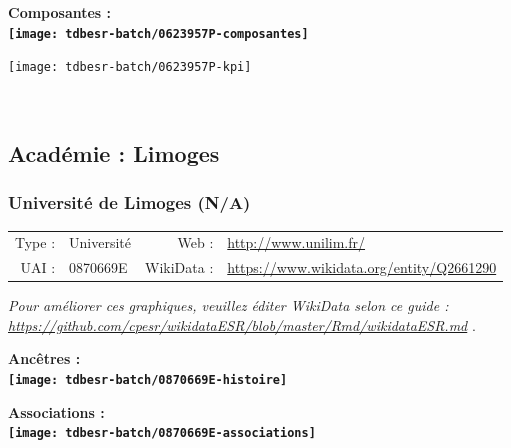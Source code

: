 \documentclass[12pt,french,]{article}
\begin{document}
\hrulefill

\begin{center} \bf Composantes : \\  
\texttt{[image: tdbesr-batch/0623957P-composantes]} \end{center}

\begin{center}\texttt{[image: tdbesr-batch/0623957P-kpi]} \end{center}\checkoddpage

\ifoddpage \fi ~\newpage  

\hypertarget{acaduxe9mie-limoges}{%
\subsection{Académie : Limoges}\label{acaduxe9mie-limoges}}

\hypertarget{universituxe9-de-limoges-na}{%
\subsubsection{Université de Limoges
(N/A)}\label{universituxe9-de-limoges-na}}

\begin{tabular*}{\textwidth}{rp{5cm}rl}  
\hline  
Type : & Université & Web : &\href{http://www.unilim.fr/}{http://www.unilim.fr/} \\  
UAI : & 0870669E & WikiData : & \href{https://www.wikidata.org/entity/Q2661290}{https://www.wikidata.org/entity/Q2661290} \\  
\hline  
\end{tabular*}

\textit{\scriptsize Pour améliorer ces graphiques, veuillez éditer WikiData selon ce guide :  \href{https://github.com/cpesr/wikidataESR/blob/master/Rmd/wikidataESR.md}{https://github.com/cpesr/wikidataESR/blob/master/Rmd/wikidataESR.md}}
.

\vspace{1cm}  
\begin{minipage}[b]{0.50\textwidth}\begin{center} \bf Ancêtres : \\  
\texttt{[image: tdbesr-batch/0870669E-histoire]} \end{center}\end{minipage}\begin{minipage}[b]{0.50\textwidth}\begin{center} \bf Associations : \\  
\texttt{[image: tdbesr-batch/0870669E-associations]} \end{center}\end{minipage}
\end{document}
